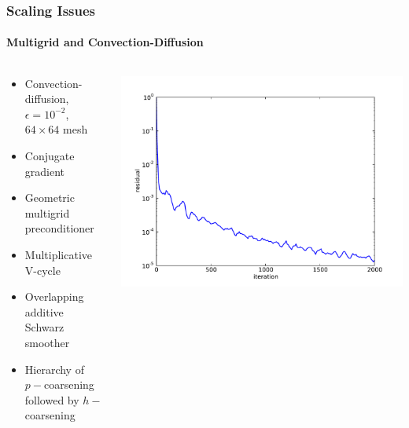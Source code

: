 \documentclass[18pt,xcolor=table]{beamer}
\begin{document}
\begin{frame}
\frametitle{Scaling Issues}
\framesubtitle{Multigrid and Convection-Diffusion}  %
\begin{columns}
\begin{column}{0.4\textwidth}
\begin{itemize}
  \item Convection-diffusion, $\epsilon=10^{-2}$, $64\times64$ mesh
  \item Conjugate gradient
  \item Geometric multigrid preconditioner
    \item Multiplicative V-cycle
    \item Overlapping additive Schwarz smoother
    \item Hierarchy of $p-$coarsening followed by $h-$coarsening
\end{itemize}
\end{column}
\begin{column}{0.6\textwidth}
\centering
\includegraphics[width=\textwidth]{Dissertation/Scaling/ConfusionResidual.pdf}
\end{column}
\end{columns}
\end{frame}
\end{document}
